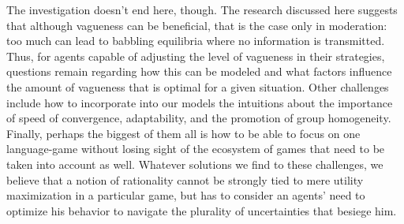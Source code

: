\documentclass[a4paper]{article}
\begin{document}
The investigation doesn't end here, though.
The research discussed here suggests that although vagueness can be beneficial, that is the case only in moderation: too much can lead to babbling equilibria where no information is transmitted.
Thus, for agents capable of adjusting the level of vagueness in their strategies, questions remain regarding how this can be modeled and what factors influence the amount of vagueness that is optimal for a given situation.
Other challenges include how to incorporate into our models the intuitions about the importance of speed of convergence, adaptability, and the promotion of group homogeneity.
Finally, perhaps the biggest of them all is how to be able to focus on one language-game without losing sight of the ecosystem of games that need to be taken into account as well.
Whatever solutions we find to these challenges, we believe that a notion of rationality cannot be strongly tied to mere utility maximization in a particular game, but has to consider an agents' need to optimize his behavior to navigate the plurality of uncertainties that besiege him.


\printbibliography
\end{document}

